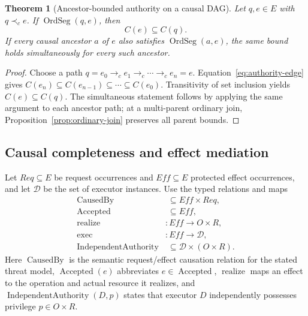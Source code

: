 \documentclass[10pt,twocolumn]{article}
\newcommand{\CausedBy}{\operatorname{CausedBy}}
\newcommand{\Realize}{\operatorname{realize}}
\newcommand{\Exec}{\operatorname{exec}}
\newcommand{\IndAuth}{\operatorname{IndependentAuthority}}
\newcommand{\Accepted}{\operatorname{Accepted}}
\newcommand{\hb}{\prec_{c}}
\newcommand{\OrdSeg}{\operatorname{OrdSeg}}
\newtheorem{theorem}{Theorem}
\begin{document}
\begin{theorem}[Ancestor-bounded authority on a causal DAG]
\label{thm:ancestor-bound}
Let $q,e\in E$ with $q\hb e$.  If $\OrdSeg(q,e)$, then
\begin{equation}
  C(e)\subseteq C(q).
  \label{eq:req-bound}
\end{equation}
If every causal ancestor $a$ of $e$ also satisfies $\OrdSeg(a,e)$, the same
bound holds simultaneously for every such ancestor.
\end{theorem}

\begin{proof}
Choose a path $q=e_0\to_c e_1\to_c\cdots\to_c e_n=e$.
Equation~\eqref{eq:authority-edge} gives
$C(e_n)\subseteq C(e_{n-1})\subseteq\cdots\subseteq C(e_0)$.  Transitivity of
set inclusion yields $C(e)\subseteq C(q)$.  The simultaneous statement follows
by applying the same argument to each ancestor path; at a multi-parent ordinary
join, Proposition~\ref{prop:ordinary-join} preserves all parent bounds.
\end{proof}

\subsection{Causal completeness and effect mediation}

Let $Req\subseteq E$ be request occurrences and $Eff\subseteq E$ protected
effect occurrences, and let $\mathcal D$ be the set of executor instances.
Use the typed relations and maps
\begin{align}
  \CausedBy &\;\subseteq Eff\times Req,\\
  \Accepted &\;\subseteq Eff,\\
  \Realize &:Eff\to O\times R,\\
  \Exec &:Eff\to\mathcal D,\\
  \IndAuth &\;\subseteq\mathcal D\times(O\times R).
\end{align}
Here $\CausedBy$ is the semantic request/effect causation relation for the
stated threat model, $\Accepted(e)$ abbreviates $e\in\Accepted$, $\Realize$
maps an effect to the operation and actual resource it realizes, and
$\IndAuth(D,p)$ states that executor $D$ independently possesses privilege
$p\in O\times R$.
\end{document}
